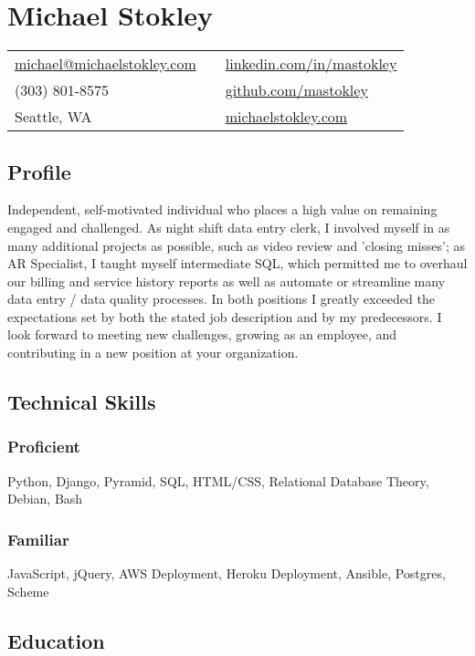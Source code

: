 \documentclass[a4paper, 10pt, oneside, hidelinks]{article}
\author{Michael Stokley}
\date{\today}
\title{}
\begin{document}
\section*{Michael Stokley}
\label{sec:orgheadline19}
\begin{center}
\begin{tabular}{lll}
\href{mailto:michael@michaelstokley.com}{michael@michaelstokley.com} &  & \href{http://www.linkedin.com/in/mastokley}{linkedin.com/in/mastokley}\\
(303) 801-8575 &  & \href{http://github.com/mastokley}{github.com/mastokley}\\
Seattle, WA &  & \href{http://www.michaelstokley.com}{michaelstokley.com}\\
\end{tabular}
\end{center}
\subsection*{Profile}
\label{sec:orgheadline1}
Independent, self-motivated individual who places a high value on remaining engaged and challenged. As night shift data entry clerk, I involved myself in as many additional projects as possible, such as video review and 'closing misses'; as AR Specialist, I taught myself intermediate SQL, which permitted me to overhaul our billing and service history reports as well as automate or streamline many data entry / data quality processes. In both positions I greatly exceeded the expectations set by both the stated job description and by my predecessors. I look forward to meeting new challenges, growing as an employee, and contributing in a new position at your organization.
\subsection*{Technical Skills}
\label{sec:orgheadline4}
\subsubsection*{Proficient}
\label{sec:orgheadline2}
Python, Django, Pyramid, SQL, HTML/CSS, Relational Database Theory, Debian, Bash
\subsubsection*{Familiar}
\label{sec:orgheadline3}
JavaScript, jQuery, AWS Deployment, Heroku Deployment, Ansible, Postgres, Scheme
\subsection*{Education}
\label{sec:orgheadline8}
\end{document}
